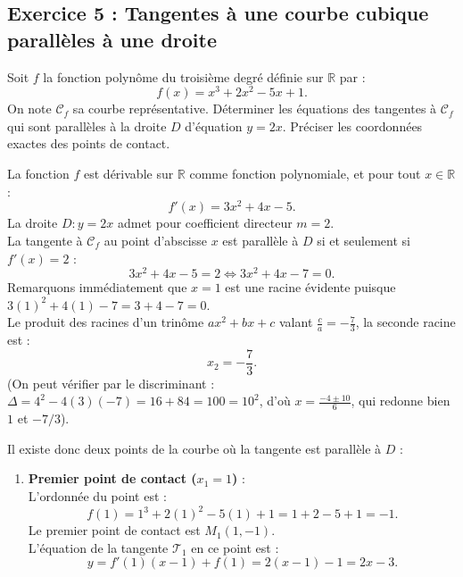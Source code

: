 \documentclass[11pt,a4paper]{article}
\newcommand{\R}{\mathbb{R}}
\begin{document}
\subsection*{Exercice 5 : Tangentes à une courbe cubique parallèles à une droite}

Soit $f$ la fonction polynôme du troisième degré définie sur $\R$ par :
\[
f(x) = x^3 + 2x^2 - 5x + 1.
\]
On note $\mathcal{C}_f$ sa courbe représentative.
Déterminer les équations des tangentes à $\mathcal{C}_f$ qui sont parallèles à la droite $D$ d'équation $y = 2x$. Préciser les coordonnées exactes des points de contact.

\begin{correctionbox}
La fonction $f$ est dérivable sur $\R$ comme fonction polynomiale, et pour tout $x \in \R$ :
\[
f'(x) = 3x^2 + 4x - 5.
\]
La droite $D : y = 2x$ admet pour coefficient directeur $m = 2$.\\
La tangente à $\mathcal{C}_f$ au point d'abscisse $x$ est parallèle à $D$ si et seulement si $f'(x) = 2$ :
\[
3x^2 + 4x - 5 = 2 \iff 3x^2 + 4x - 7 = 0.
\]
Remarquons immédiatement que $x = 1$ est une racine évidente puisque $3(1)^2 + 4(1) - 7 = 3 + 4 - 7 = 0$.\\
Le produit des racines d'un trinôme $ax^2 + bx + c$ valant $\frac{c}{a} = -\frac{7}{3}$, la seconde racine est :
\[
x_2 = -\frac{7}{3}.
\]
(On peut vérifier par le discriminant : $\Delta = 4^2 - 4(3)(-7) = 16 + 84 = 100 = 10^2$, d'où $x = \frac{-4 \pm 10}{6}$, qui redonne bien $1$ et $-7/3$).

Il existe donc deux points de la courbe où la tangente est parallèle à $D$ :
\begin{enumerate}[label=\textbf{\arabic*.}]
    \item \textbf{Premier point de contact ($x_1 = 1$)} :\\
    L'ordonnée du point est :
    \[
    f(1) = 1^3 + 2(1)^2 - 5(1) + 1 = 1 + 2 - 5 + 1 = -1.
    \]
    Le premier point de contact est $M_1(1, -1)$.\\
    L'équation de la tangente $\mathcal{T}_1$ en ce point est :
    \[
    y = f'(1)(x - 1) + f(1) = 2(x - 1) - 1 = 2x - 3.
    \]


\end{enumerate}
\end{correctionbox}
\end{document}
